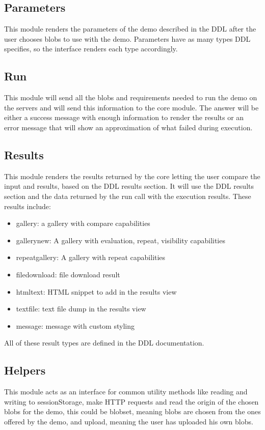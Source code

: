 \subsection{Parameters}
This module renders the parameters of the demo described in the DDL after the user chooses blobs to use with the demo. 
Parameters have as many types DDL specifies, so the interface renders each type accordingly.

\subsection{Run}
This module will send all the blobs and requirements needed to run the demo on the servers and will send this information to 
the core module. The answer will be either a success message with enough information to render the results or an error message 
that will show an approximation of what failed during execution.

\subsection{Results}
This module renders the results returned by the core letting the user compare the input and results, based on the DDL results section. 
It will use the DDL results section and the data returned by the run call with the execution results. These results include:

\begin{itemize}
	\item gallery: a gallery with compare capabilities
	\item gallery\textunderscore new: A gallery with evaluation, repeat, visibility capabilities
	\item repeat\textunderscore gallery: A gallery with repeat capabilities
	\item file\textunderscore download: file download result
	\item html\textunderscore text: HTML snippet to add in the results view
	\item text\textunderscore file: text file dump in the results view
	\item message: message with custom styling
\end{itemize}

All of these result types are defined in the DDL documentation.


\subsection{Helpers}
This module acts as an interface for common utility methods like reading and writing to sessionStorage, make HTTP requests and 
read the origin of the chosen blobs for the demo, this could be blobset, meaning blobs are chosen from the ones offered by the 
demo, and upload, meaning the user has uploaded his own blobs.

